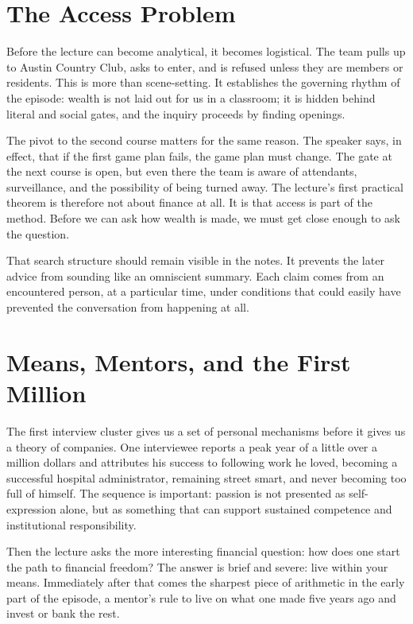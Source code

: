 \section{The Access Problem}

Before the lecture can become analytical, it becomes logistical. The team pulls up to Austin Country Club, asks to enter, and is refused unless they are members or residents. This is more than scene-setting. It establishes the governing rhythm of the episode: wealth is not laid out for us in a classroom; it is hidden behind literal and social gates, and the inquiry proceeds by finding openings.

The pivot to the second course matters for the same reason. The speaker says, in effect, that if the first game plan fails, the game plan must change. The gate at the next course is open, but even there the team is aware of attendants, surveillance, and the possibility of being turned away. The lecture's first practical theorem is therefore not about finance at all. It is that access is part of the method. Before we can ask how wealth is made, we must get close enough to ask the question.

That search structure should remain visible in the notes. It prevents the later advice from sounding like an omniscient summary. Each claim comes from an encountered person, at a particular time, under conditions that could easily have prevented the conversation from happening at all.

\section{Means, Mentors, and the First Million}

The first interview cluster gives us a set of personal mechanisms before it gives us a theory of companies. One interviewee reports a peak year of a little over a million dollars and attributes his success to following work he loved, becoming a successful hospital administrator, remaining street smart, and never becoming too full of himself. The sequence is important: passion is not presented as self-expression alone, but as something that can support sustained competence and institutional responsibility.

Then the lecture asks the more interesting financial question: how does one start the path to financial freedom? The answer is brief and severe: live within your means. Immediately after that comes the sharpest piece of arithmetic in the early part of the episode, a mentor's rule to live on what one made five years ago and invest or bank the rest.


